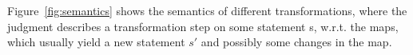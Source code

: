 Figure~\ref{fig:semantics} shows the semantics of different transformations, where the judgment describes a transformation step on some statement s, w.r.t. the maps, which usually yield a new statement $s'$ and possibly some changes in the map.\\
%
%
